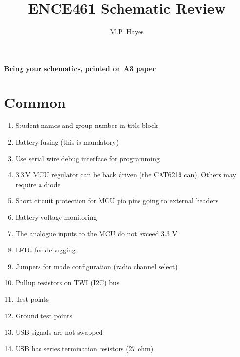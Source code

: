 \documentclass[a4paper, 12pt]{article}
\title{ENCE461 Schematic Review}
\author{M.P. Hayes}
\date{}
\begin{document}
\maketitle


\begin{center}
\textbf{Bring your schematics, printed on A3 paper}
\end{center}


\section{Common}

\begin{enumerate}
\item Student names and group number in title block

\item Battery fusing (this is mandatory)

\item Use serial wire debug interface for programming

\item 3.3\,V MCU regulator can be back driven (the CAT6219 can).  Others may require a diode

\item Short circuit protection for MCU pio pins going to external headers

\item Battery voltage monitoring

\item The analogue inputs to the MCU do not exceed 3.3 V

\item LEDs for debugging

\item Jumpers for mode configuration (radio channel select)

\item Pullup resistors on TWI (I2C) bus

\item Test points

\item Ground test points

\item USB signals are not swapped

\item USB has series termination resistors (27 ohm)



\end{enumerate}
\end{document}
